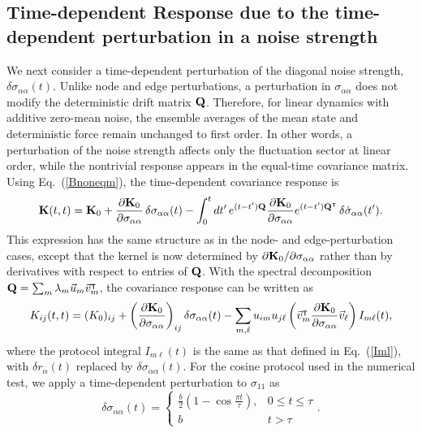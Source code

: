 \subsection{Time-dependent Response due to the time-dependent perturbation in a noise strength}
\quad We next consider a time-dependent perturbation of the diagonal noise strength, $\delta \sigma_{\alpha\alpha}(t)$. Unlike node and edge perturbations, a perturbation in $\sigma_{\alpha\alpha}$ does not modify the deterministic drift matrix ${\bf Q}$. Therefore, for linear dynamics with additive zero-mean noise, the ensemble averages of the mean state and deterministic force remain unchanged to first order. In other words, a perturbation of the noise strength affects only the fluctuation sector at linear order, while the nontrivial response appears in the equal-time covariance matrix. Using Eq.~(\ref{Bnoneqm}), the time-dependent covariance response is
\begin{equation}
    {\bf K}(t,t)
    =
    {\bf K}_0
    +
    \frac{\partial {\bf K}_0}{\partial \sigma_{\alpha\alpha}}
    \,\delta \sigma_{\alpha\alpha}(t)
    -
    \int_0^t dt'\,
    e^{(t-t'){\bf Q}}
    \frac{\partial {\bf K}_0}{\partial \sigma_{\alpha\alpha}}
    e^{(t-t'){\bf Q}^\intercal}
    \,\delta \dot{\sigma}_{\alpha\alpha}(t').
    \label{Ksigma_time_response}
\end{equation}
This expression has the same structure as in the node- and edge-perturbation cases, except that the kernel is now determined by $\partial {\bf K}_0/\partial \sigma_{\alpha\alpha}$ rather than by derivatives with respect to entries of ${\bf Q}$. With the spectral decomposition ${\bf Q}=\sum_m \lambda_m {\vec u_m}{\vec v_m}^\intercal$, the covariance response can be written as
\begin{equation}
    K_{ij}(t,t)
    =
    (K_0)_{ij}
    +
    \left(
    \frac{\partial {\bf K}_0}{\partial \sigma_{\alpha\alpha}}
    \right)_{ij}
    \delta \sigma_{\alpha\alpha}(t)
    -
    \sum_{m,\ell}
    u_{im}u_{j\ell}
    \left(
    {\vec v_m}^\intercal
    \frac{\partial {\bf K}_0}{\partial \sigma_{\alpha\alpha}}
    {\vec v_\ell}
    \right)
    I_{m\ell}(t),
    \label{Ksigma_mode_expansion}
\end{equation}
where the protocol integral $I_{m\ell}(t)$ is the same as that defined in Eq.~(\ref{Iml}), with $\delta r_\alpha(t)$ replaced by $\delta \sigma_{\alpha\alpha}(t)$. For the cosine protocol used in the numerical test, we apply a time-dependent perturbation to $\sigma_{11}$ as
\begin{equation}
    \delta \sigma_{\alpha\alpha}(t)=\begin{cases} \frac{b}{2}(1-\cos\frac{\pi t}{\tau}), & 0\leq t\leq\tau \\
              b                                      & t>\tau
    \end{cases}.\label{dsaa(t)cos}
\end{equation}
